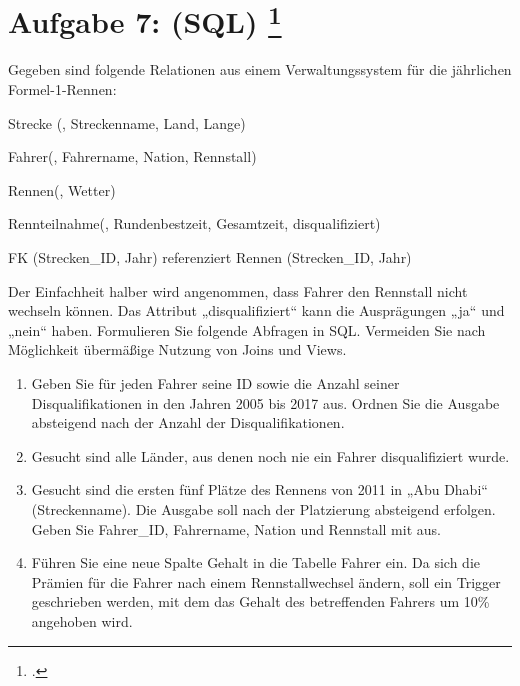 \documentclass{lehramt-informatik-aufgabe}
\begin{document}
\section{Aufgabe 7: (SQL)
\footcite{66116:2019:09}}

Gegeben sind folgende Relationen aus einem Verwaltungssystem für die
jährlichen Formel-1-Rennen:

\begin{liRmodell}
Strecke (, Streckenname, Land, Lange)

Fahrer(, Fahrername, Nation, Rennstall)

Rennen(, Wetter)

Rennteilnahme(, Rundenbestzeit, Gesamtzeit,
disqualifiziert)

FK (Strecken\_ID, Jahr) referenziert Rennen (Strecken\_ID, Jahr)
\end{liRmodell}

\noindent
Der Einfachheit halber wird angenommen, dass Fahrer den Rennstall nicht
wechseln können. Das Attribut „disqualifiziert“ kann die Ausprägungen
„ja“ und „nein“ haben. Formulieren Sie folgende Abfragen in SQL.
Vermeiden Sie nach Möglichkeit übermäßige Nutzung von Joins und Views.

\begin{enumerate}
\item Geben Sie für jeden Fahrer seine ID sowie die Anzahl seiner
Disqualifikationen in den Jahren 2005 bis 2017 aus. Ordnen Sie die
Ausgabe absteigend nach der Anzahl der Disqualifikationen.

\item Gesucht sind alle Länder, aus denen noch nie ein Fahrer
disqualifiziert wurde.

\item Gesucht sind die ersten fünf Plätze des Rennens von 2011 in „Abu
Dhabi“ (Streckenname). Die Ausgabe soll nach der Platzierung absteigend
erfolgen. Geben Sie Fahrer\_ID, Fahrername, Nation und Rennstall mit
aus.

\item Führen Sie eine neue Spalte Gehalt in die Tabelle Fahrer ein. Da
sich die Prämien für die Fahrer nach einem Rennstallwechsel ändern, soll
ein Trigger geschrieben werden, mit dem das Gehalt des betreffenden
Fahrers um 10\% angehoben wird.
\end{enumerate}
\end{document}
